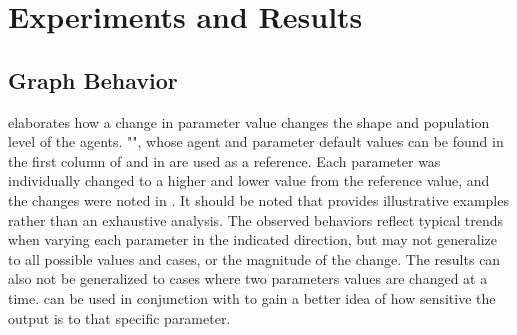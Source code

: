 \chapter{Experiments and Results}
\label{AER}

\section{Graph Behavior}
 elaborates how a change in parameter value changes the shape and population level of the agents. 
"", whose agent and parameter default values can be found in the first column of  and in  are used as a reference. 
Each parameter was individually changed to a higher and lower value from the reference value, and the changes were noted in . 
It should be noted that  provides illustrative examples rather than an exhaustive analysis. The observed behaviors reflect typical trends when varying each parameter in the indicated direction, but may not generalize to all possible values and cases, or the magnitude of the change. 
The results can also not be generalized to cases where two parameters values are changed at a time. 
 can be used in conjunction with  to gain a better idea of how sensitive the output is to that specific parameter. 

